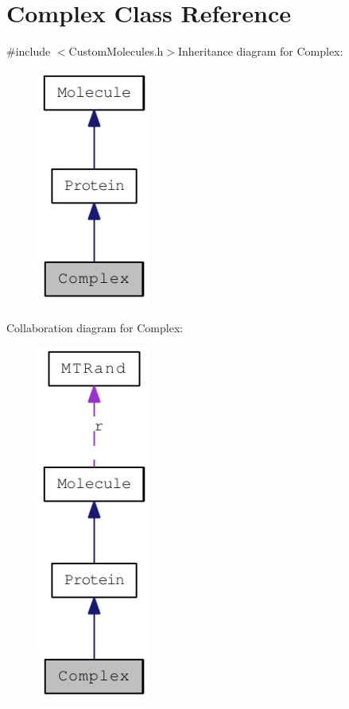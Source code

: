 \hypertarget{classComplex}{
\section{Complex Class Reference}
\label{classComplex}
}


{\ttfamily \#include $<$CustomMolecules.h$>$}Inheritance diagram for Complex:\nopagebreak
\begin{figure}[H]
\begin{center}
\leavevmode
\includegraphics[width=106pt]{classComplex__inherit__graph}
\end{center}
\end{figure}
Collaboration diagram for Complex:\nopagebreak
\begin{figure}[H]
\begin{center}
\leavevmode
\includegraphics[width=106pt]{classComplex__coll__graph}
\end{center}
\end{figure}

